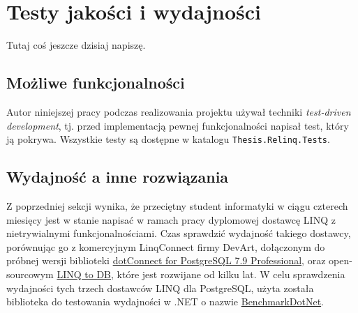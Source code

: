 \chapter{Testy jakości i wydajności}
Tutaj coś jeszcze dzisiaj napiszę.

\section{Możliwe funkcjonalności}
Autor niniejszej pracy podczas realizowania projektu używał techniki \textit{test-driven development}, tj. przed implementacją pewnej funkcjonalności napisał test, który ją pokrywa. Wszystkie testy są dostępne w katalogu \texttt{Thesis.Relinq.Tests}.

\section{Wydajność a inne rozwiązania}
Z poprzedniej sekcji wynika, że przeciętny student informatyki w ciągu czterech miesięcy jest w stanie napisać w ramach pracy dyplomowej dostawcę LINQ z nietrywialnymi funkcjonalnościami. Czas sprawdzić wydajność takiego dostawcy, porównując go z komercyjnym LinqConnect firmy DevArt, dołączonym do próbnej wersji biblioteki \href{https://www.devart.com/dotconnect/postgresql/}{dotConnect for PostgreSQL 7.9 Professional}, oraz open-sourcowym \href{https://github.com/linq2db/linq2db}{LINQ to DB}, które jest rozwijane od kilku lat. W celu sprawdzenia wydajności tych trzech dostawców LINQ dla PostgreSQL, użyta została biblioteka do testowania wydajności w .NET o nazwie \href{https://github.com/dotnet/BenchmarkDotNet}{BenchmarkDotNet}.